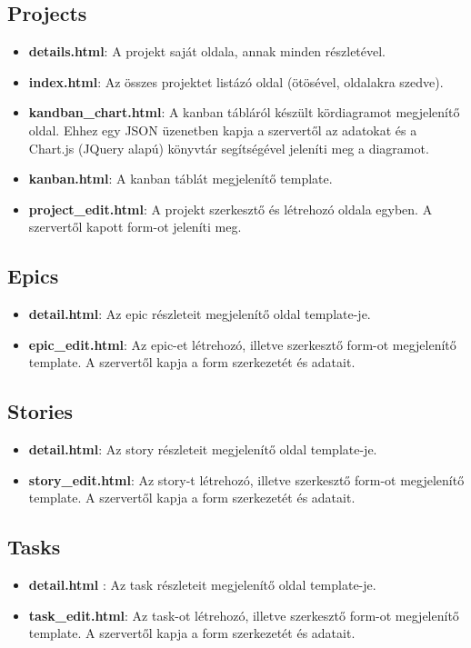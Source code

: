 \subsection{Projects}
\begin{itemize}
	\item \textbf{details.html}: A projekt saját oldala, annak minden részletével.
	\item \textbf{index.html}: Az összes projektet listázó oldal (ötösével, oldalakra szedve).
	\item \textbf{kandban\_chart.html}: A kanban tábláról készült kördiagramot megjelenítő oldal. Ehhez egy JSON üzenetben kapja a szervertől az adatokat és a Chart.js (JQuery alapú) könyvtár segítségével jeleníti meg a diagramot.
	\item \textbf{kanban.html}: A kanban táblát megjelenítő template.
	\item \textbf{project\_edit.html}: A projekt szerkesztő és létrehozó oldala egyben. A szervertől kapott form-ot jeleníti meg.
\end{itemize}
\subsection{Epics}
\begin{itemize}
	\item \textbf{detail.html}: Az epic részleteit megjelenítő oldal template-je.
	\item \textbf{epic\_edit.html}: Az epic-et létrehozó, illetve szerkesztő form-ot megjelenítő template. A szervertől kapja a form szerkezetét és adatait.
\end{itemize}
\subsection{Stories}
\begin{itemize}
	\item \textbf{detail.html}: Az story részleteit megjelenítő oldal template-je.
	\item \textbf{story\_edit.html}: Az story-t létrehozó, illetve szerkesztő form-ot megjelenítő template. A szervertől kapja a form szerkezetét és adatait.
\end{itemize}
\subsection{Tasks}
\begin{itemize}
	\item \textbf{detail.html} : Az task részleteit megjelenítő oldal template-je.
	\item \textbf{task\_edit.html}: Az task-ot létrehozó, illetve szerkesztő form-ot megjelenítő template. A szervertől kapja a form szerkezetét és adatait.
\end{itemize}
